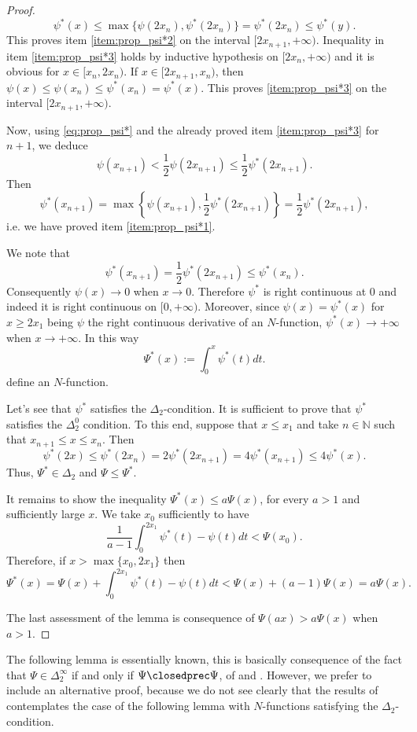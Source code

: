 \documentclass[twoside]{article}
\theoremstyle{remark}
\renewcommand{\leq}{\leqslant}
\renewcommand{\geq}{\geqslant}
\begin{document}
\begin{proof}
\[\psi^*(x)\leq\max\{\psi(2x_n),\psi^*(2x_n)\}=\psi^*(2x_n)\leq\psi^*(y).\]
This proves item \ref{item:prop_psi*2} on the interval $[2x_{n+1},+\infty)$.
Inequality in item \ref{item:prop_psi*3} holds by inductive hypothesis on $[2x_n,+\infty)$ 
and it is obvious for  $x\in[x_n,2x_n)$. 
If $ x\in[2x_{n+1},x_n)$, then $\psi(x)\leq\psi(x_n)\leq\psi^*(x_n)=\psi^*(x)$. 
This proves  \ref{item:prop_psi*3} on the interval $[2x_{n+1},+\infty)$.

Now, using \eqref{eq:prop_psi*} and the already proved item \ref{item:prop_psi*3} for $n+1$, we deduce
\[\psi(x_{n+1})<\frac12\psi(2x_{n+1})\leq \frac12\psi^*(2x_{n+1}). \]
Then
\[\psi^*(x_{n+1})=\max\left\{\psi(x_{n+1}),\frac12\psi^*(2x_{n+1}) \right\}=\frac12\psi^*(2x_{n+1}),\]
i.e. we have proved item \ref{item:prop_psi*1}.

We note that
\[\psi^*(x_{n+1})=\frac12\psi^*(2x_{n+1})\leq\psi^*(x_{n}).\]
Consequently $\psi(x)\to 0$ when $x\to 0$. 
Therefore $\psi^*$ is right continuous at $0$ and indeed it is right continuous on $[0,+\infty)$. 
Moreover, since $\psi(x)=\psi^*(x)$ for $x\geq 2x_1$ being $\psi$ the right continuous derivative of an $N$-function, $\psi^*(x)\to +\infty$ when $x\to +\infty$. In this way
\[\Psi^*(x):=\int_0^x\psi^*(t)dt.\]
define an $N$-function.

Let's see that $\psi^*$ satisfies the $\Delta_2$-condition.
It is sufficient to prove that $\psi^*$ satisfies the $ \Delta_2^0$ condition. 
To this end, suppose that  $x\leq x_1$ and take $n\in\mathbb{N}$ such that $x_{n+1}\leq x\leq x_n$. Then
\[\psi^*(2x)\leq \psi^*(2x_n)=2\psi^*(2x_{n+1})=4\psi^*(x_{n+1})\leq 4\psi^*(x).\]
Thus,  $\Psi^* \in  \Delta_2$ and $\Psi\leq \Psi^*$.

It remains to show the inequality $\Psi^*(x)\leq a\Psi(x)$, 
for every $a>1$ and sufficiently large $x$. We take $x_0$ sufficiently to have
\[\frac{1}{a-1}\int_0^{2x_1}\psi^*(t)-\psi(t)dt<\Psi(x_0).\]
Therefore, if  $x>\max\{x_0,2x_1\}$ then
\[\Psi^*(x)=\Psi(x)+\int_0^{2x_1}\psi^*(t)-\psi(t)dt<\Psi(x)+(a-1)\Psi(x)= a\Psi(x).\]

The last assessment of the lemma is consequence of   $\Psi(ax)>a\Psi(x)$ when $a>1$. 

\end{proof}



The following lemma is essentially known,  this is basically consequence  of the fact that $\Psi\in\Delta_2^{\infty}$ if and only if $\Psi\closedprec\Psi$, of  \cite[Prop. 4, p. 20]{rao1991theory} and \cite[Cor. 10, p. 30]{rao1991theory}. 
However, we prefer to include an alternative proof, because we do not see clearly that the results of \cite{rao1991theory} contemplates the case of the following lemma with $N$-functions satisfying the $\Delta_2$-condition.
\end{document}
